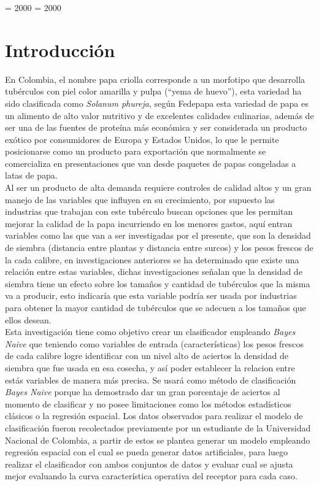 
\righthyphenmin = 2000
\lefthyphenmin = 2000

\chapter*{Introducci\'on}

En Colombia, el nombre papa criolla corresponde a un morfotipo que desarrolla tubérculos con piel color amarilla y pulpa ("`yema de huevo"'), esta variedad ha sido clasificada como \textit{Solanum phureja}, según Fedepapa esta variedad de papa es un alimento de alto valor nutritivo y de excelentes calidades culinarias, además de ser una de las fuentes de proteína más económica y ser considerada un producto exótico por consumidores de Europa y Estados Unidos, lo que le permite posicionarse como un producto para exportación que normalmente se comercializa en presentaciones que van desde paquetes de papas congeladas a latas de papa.\\

Al ser un producto de alta demanda requiere controles de calidad altos y un gran manejo de las variables que influyen en su crecimiento, por supuesto las industrias que trabajan con este tubérculo buscan opciones que les permitan mejorar la calidad de la papa incurriendo en los menores gastos, aquí entran variables como las que van a ser investigadas por el presente, que son la densidad de siembra (distancia entre plantas y distancia entre surcos) y los pesos frescos de la cada calibre, en investigaciones anteriores se ha determinado que existe una relación entre estas variables, dichas investigaciones señalan que la densidad de siembra tiene un efecto sobre los tamaños y cantidad de tubérculos que la misma va a producir, esto indicaría que esta variable podría ser usada por industrias para obtener la mayor cantidad de tubérculos que se adecuen a los tamaños que ellos desean. \\

Esta investigación tiene como objetivo crear un clasificador empleando \textit{Bayes Naive} que teniendo como variables de entrada (características) los pesos frescos de cada calibre logre identificar con un nivel alto de aciertos la densidad de siembra que fue usada en esa cosecha, y así poder establecer la relacion entre estás variables de manera más precisa. Se usará como método de clasificación \textit{Bayes Naive} porque ha demostrado dar un gran porcentaje de aciertos al momento de clasificar y no posee limitaciones como los métodos estadísticos clásicos o la regresión espacial. Los datos observados para realizar el modelo de clasificación fueron recolectados previamente por un estudiante de la Universidad Nacional de Colombia, a partir de estos se plantea generar un modelo empleando regresión espacial con el cual se pueda generar datos artificiales, para luego realizar el clasificador con ambos conjuntos de datos y evaluar cual se ajusta mejor evaluando la curva característica operativa del receptor para cada caso.\\ 


